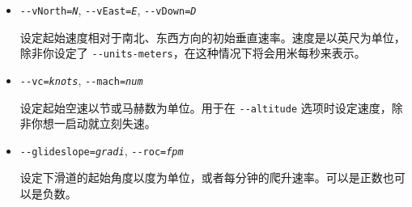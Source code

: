 \begin{itemize}
{\begin{itemize}
设定飞机在 X、Y 和 Z 轴上的起始速度。速度以英尺每秒来表示，除非你还选择了 \texttt{-$ $-units-meters}，在这种情况下将会用米每秒来表示。

\item{\texttt{-$ $-vNorth={\it N}}, \texttt{-$ $-vEast={\it E}}, \texttt{-$ $-vDown={\it D}}}


设定起始速度相对于南北、东西方向的初始垂直速率。速度是以英尺为单位，除非你设定了 \texttt{-$ $-units-meters}，在这种情况下将会用米每秒来表示。

\item{\texttt{-$ $-vc={\it knots}}, \texttt{-$ $-mach={\it num}}}

设定起始空速以节或马赫数为单位。用于在 \texttt{-$ $-altitude} 选项时设定速度，除非你想一启动就立刻失速。

\item{\texttt{-$ $-glideslope={\it gradi}}, \texttt{-$ $-roc={\it fpm}}}

设定下滑道的起始角度以度为单位，或者每分钟的爬升速率。可以是正数也可以是负数。

 \end{itemize}

}
\fi








\end{itemize}
